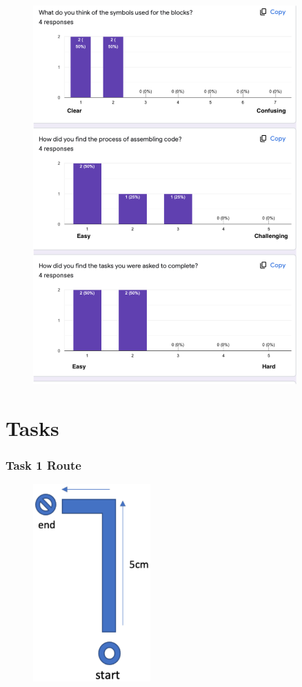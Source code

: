 \documentclass[oneside,%
                    author={Malak Hajji},
                    degree={BSc},
                    title={Designing An Accessible Ozobot Programming Platform for Students},
                  subtitle={With Mixed Visual Abilities}]{dissertation}
\begin{document}
\FloatBarrier
\begin{figure}
    \centering
    \includegraphics[width=0.9\textwidth]{thesis/feedback.eps}
    \label{fig-feedback2}
\end{figure}
\FloatBarrier

\chapter{Tasks}
\label{taskroute}

\subsection{Task 1 Route}
\FloatBarrier
\begin{figure}[h]
    \centering
    \includegraphics[width=0.4\textwidth]{thesis/task1route.eps}
    \label{fig-route1}
\end{figure}
\FloatBarrier
\end{document}
